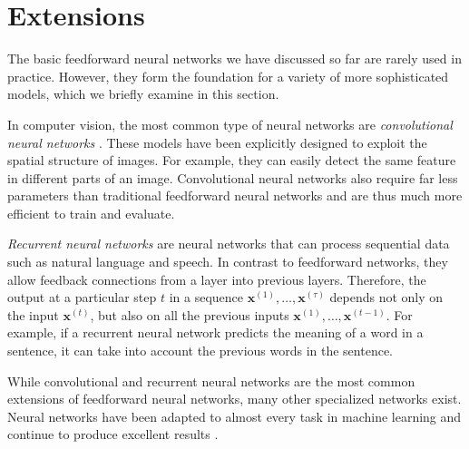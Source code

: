 \section{Extensions}
\label{sec:extensions}
The basic feedforward neural networks we have discussed so far are rarely used in practice. However, they form the foundation for a variety of more sophisticated models, which we briefly examine in this section.

In computer vision, the most common type of neural networks are \emph{convolutional neural networks} \cite{LeCun1989}. These models have been explicitly designed to exploit the spatial structure of images. For example, they can easily detect the same feature in different parts of an image. Convolutional neural networks also require far less parameters than traditional feedforward neural networks and are thus much more efficient to train and evaluate.

\emph{Recurrent neural networks} \cite{Rumelhart1986533} are neural networks that can process sequential data such as natural language and speech. In contrast to feedforward networks, they allow feedback connections from a layer into previous layers. Therefore, the output at a particular step $t$ in a sequence $\bm{x}^{(1)}, \ldots, \bm{x}^{(\tau)}$ depends not only on the input $\bm{x}^{(t)}$, but also on all the previous inputs $\bm{x}^{(1)}, \ldots, \bm{x}^{(t-1)}$. For example, if a recurrent neural network predicts the meaning of a word in a sentence, it can take into account the previous words in the sentence.

While convolutional and recurrent neural networks are the most common extensions of feedforward neural networks, many other specialized networks exist. Neural networks have been adapted to almost every task in machine learning and continue to produce excellent results \cite[Ch.\,5,\,pp.\,96-100]{DBLP:books/daglib/0040158}.